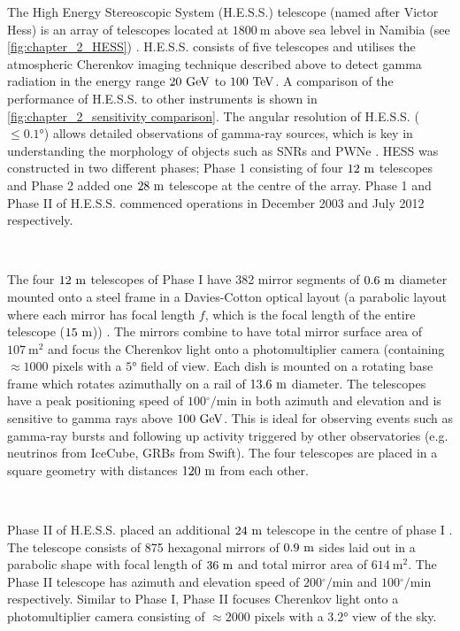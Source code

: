 The High Energy Stereoscopic System (H.E.S.S.) telescope (named after Victor Hess) is an array of telescopes located at $1800~\si{\m}$ above sea lebvel in Namibia (see \autoref{fig:chapter_2_HESS}) \citep{HESS}. H.E.S.S. consists of five telescopes and utilises the atmospheric Cherenkov imaging technique described above to detect gamma radiation in the energy range $20~\si{\giga\electronvolt}$ to $100~\TeV$. A comparison of the performance of H.E.S.S. to other instruments is shown in \autoref{fig:chapter_2_sensitivity comparison}. The angular resolution of H.E.S.S. ($\leq\ang{0.1}$) allows detailed observations of gamma-ray sources, which is key in understanding the morphology of objects such as SNRs and PWNe \citep{2018A&A...612A...1H}. HESS was constructed in two different phases; Phase 1 consisting of four $12~\si{\meter}$ telescopes and Phase 2 added one $28~\si{\meter}$ telescope at the centre of the array. Phase 1 and Phase II of H.E.S.S. commenced operations in December 2003 and July 2012 respectively. 
\par~\par 
The four $12~\si{\meter}$ telescopes of Phase I have 382 mirror segments of $0.6~\si{\meter}$ diameter mounted onto a steel frame in a Davies-Cotton optical layout (a parabolic layout where each mirror has focal length $f$, which is the focal length of the entire telescope ($15~\si{\meter}$)) \citep{2003APh....20..111B}. The mirrors combine to have total mirror surface area of $107~\si{\meter\squared}$ and focus the Cherenkov light onto a photomultiplier camera (containing $\approx 1000$ pixels with a $\ang{5}$ field of view. Each dish is mounted on a rotating base frame which rotates azimuthally on a rail of $13.6~\si{\meter}$ diameter. The telescopes have a peak positioning speed of $100\si{^\circ\per\minute}$ in both azimuth and elevation and is sensitive to gamma rays above $100~\si{\giga\electronvolt}$. This is ideal for observing events such as gamma-ray bursts and following up activity triggered by other observatories (e.g. neutrinos from IceCube, GRBs from Swift). The four telescopes are placed in a square geometry with distances $120~\si{\meter}$ from each other.
\par~\par
Phase II of H.E.S.S. placed an additional $24~\si{\meter}$ telescope in the centre of phase I \citep{2005ICRC....5..163V}. The telescope consists of 875 hexagonal mirrors of $0.9~\si{\meter}$ sides laid out in a parabolic shape with focal length of $36~\si{\meter}$ and total mirror area of $614~\si{\meter\squared}$. The Phase II telescope has azimuth and elevation speed of $200\si{^\circ\per\minute}$ and $100\si{^\circ\per\minute}$ respectively. Similar to Phase I, Phase II focuses Cherenkov light onto a photomultiplier camera consisting of $\approx 2000$ pixels with a $\ang{3.2}$ view of the sky.

